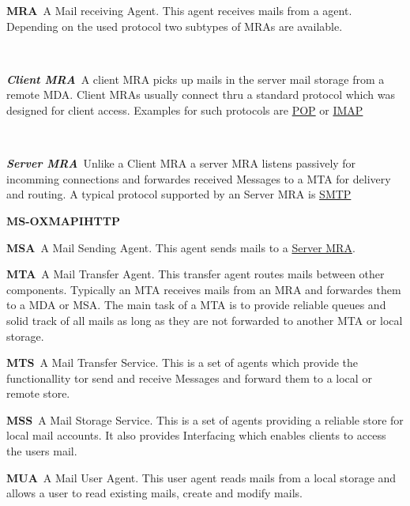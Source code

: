 \documentclass[a4paper,appendixprefix,pdfusetitle,twocolumn,draft,8pt]{scrbook}
\newenvironment{entry}{\par\leavevmode\hangpara{1.5mm}{1}\ignorespaces}{\RaggedRight\par}
\newcommand*{\mainentry}[2]{{\bfseries{#1\label{def:#1}}}~#2\par}
\newcommand*{\subentry}[2]{\par~\begin{minipage}{\columnwidth-0.6cm}{\bfseries{\itshape{#1\label{def:#1}}}}~#2\end{minipage}}
\newcommand*{\defref}[1]{\hyperref[def:#1]{#1}}
\begin{document}
\begin{entry}
  \mainentry{MRA}{A Mail receiving Agent. This agent receives mails from a agent. Depending on the used protocol two subtypes of MRAs are available.}
  \subentry{Client MRA}{A client MRA picks up mails in the server mail storage from a remote MDA. Client MRAs usually connect thru a standard protocol which was designed for client access. Examples for such protocols are \defref{POP} or \defref{IMAP}}
  \subentry{Server MRA}{Unlike a Client MRA a server MRA listens passively for incomming connections and forwardes received Messages to a MTA for delivery and routing. A typical protocol supported by an Server MRA is \defref{SMTP}}
\end{entry}

\begin{entry}
  \mainentry{MS-OXMAPIHTTP}{}
\end{entry}

\begin{entry}
  \mainentry{MSA}{A Mail Sending Agent. This agent sends mails to a \defref{Server MRA}. }
\end{entry}

\begin{entry}
  \mainentry{MTA}{A Mail Transfer Agent. This transfer agent routes mails between other components. Typically  an MTA receives mails from an MRA and forwardes them to a MDA or MSA. The main task of a MTA is to provide reliable queues and solid track of all mails as long as they are not forwarded to another MTA or local storage.}
\end{entry}

\begin{entry}
  \mainentry{MTS}{A Mail Transfer Service. This is a set of agents which provide the functionallity tor send and receive Messages and forward them to a local or remote store.}
\end{entry}

\begin{entry}
  \mainentry{MSS}{A Mail Storage Service. This is a set of agents providing a reliable store for local mail accounts. It also provides Interfacing which enables clients to access the users mail.}
\end{entry}

\begin{entry}
  \mainentry{MUA}{A Mail User Agent. This user agent reads mails from a local storage and allows a user to read existing mails, create and modify mails.}
\end{entry}
\end{document}
